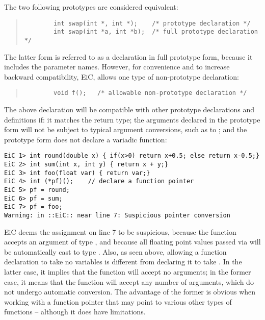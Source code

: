 The two following prototypes are considered equivalent: 

\begin{quote}
\begin{verbatim}
        int swap(int *, int *);    /* prototype declaration */ 
        int swap(int *a, int *b);  /* full prototype declaration */ 
\end{verbatim}
\end{quote}

The latter form is referred to as a declaration in full prototype
form, because it includes the parameter names. However, for convenience
and to increase backward compatibility, EiC, allows one type of
non-prototype declaration:

\begin{quote}
\begin{verbatim}
        void f();   /* allowable non-prototype declaration */ 
\end{verbatim}
\end{quote}

The above declaration will be compatible with other prototype
declarations and definitions if: it matches the return type; the
arguments declared in the prototype form will not be subject to
typical argument conversions, such as  to ; and the
prototype form does not declare a variadic function:

\begin{production}
\begin{verbatim}
EiC 1> int round(double x) { if(x>0) return x+0.5; else return x-0.5;} 
EiC 2> int sum(int x, int y) { return x + y;}
EiC 3> int foo(float var) { return var;}
EiC 4> int (*pf)();    // declare a function pointer
EiC 5> pf = round;    
EiC 6> pf = sum;      
EiC 7> pf = foo;       
Warning: in ::EiC:: near line 7: Suspicious pointer conversion
\end{verbatim}
\end{production}

EiC deems the assignment on line 7 to be suspicious, because the function
 accepts an argument of type , and because all 
floating point values passed via  will be automatically cast to
type . Also, as seen above, allowing a function declaration
to take no variables is different from declaring it to take
. In the latter case, it implies that the function will accept
no arguments; in the former case, it means that the function will
accept any number of arguments, which do not undergo automatic
conversion. The advantage of the former is obvious when working with a
function pointer that may point to various other types of functions --
although it does have limitations.

